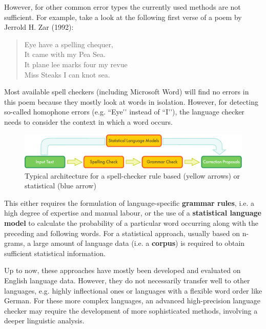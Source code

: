\begin{multicols}{2}
However, for other common error types the currently used methods are
not sufficient. For example, take a look at the following first verse
of a poem by Jerrold H. Zar (1992):
\begin{quote}
Eye have a spelling chequer,\\
It came with my Pea Sea.\\
It plane lee marks four my revue\\
Miss Steaks I can knot sea.
\end{quote}
Most available spell checkers (including Microsoft Word) will find
no errors in this poem because they mostly look at words in
isolation. However, for detecting so-called homophone errors
(e.g. ``Eye{\mbox '}{\mbox '} instead of ``I{\mbox '}{\mbox '}), the language checker needs to consider
the context in which a word occurs.

\begin{figure}[!ht]
\begin{center}
  \includegraphics[width=\textwidth]{../_media/english/language_checking}
\caption{Typical architecture for a spell-checker rule based (yellow arrows) or statistical (blue arrow)}
\label{fig:spellcheckerEn}
\end{center}
\end{figure}

This either requires the formulation of language-specific {\bf grammar
rules}, i.e. a high degree of expertise and manual labour, or the use
of a {\bf statistical language model} to calculate the probability of a
particular word occurring along with the preceding and following
words. For a statistical approach, usually based on n-grams, a large
amount of language data (i.e. a {\bf corpus}) is required to obtain
sufficient statistical information.  

Up to now, these approaches have mostly been developed and evaluated
on English language data. However, they do not necessarily transfer
well to other languages, e.g. highly inflectional ones or languages
with a flexible word order like German. For these more complex
languages, an advanced high-precision language checker may require the
development of more sophisticated methods, involving a deeper
linguistic analysis.


\end{multicols}
